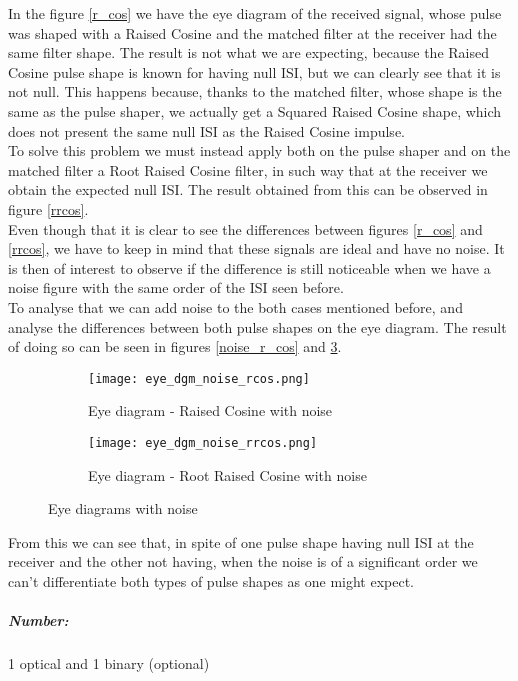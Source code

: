 In the figure \ref{r_cos} we have the eye diagram of the received signal, whose pulse was shaped with a Raised Cosine and the matched filter at the receiver had the same filter shape. The result is not what we are expecting, because the Raised Cosine pulse shape is known for having null ISI, but we can clearly see that it is not null. This happens because, thanks to the matched filter, whose shape is the same as the pulse shaper, we actually get a Squared Raised Cosine shape, which does not present the same null ISI as the Raised Cosine impulse.\\
To solve this problem we must instead apply both on the pulse shaper and on the matched filter a Root Raised Cosine filter, in such way that at the receiver we obtain the expected null ISI. The result obtained from this can be observed in figure \ref{rrcos}.\\
Even though that it is clear to see the differences between figures  \ref{r_cos} and  \ref{rrcos}, we have to keep in mind that these signals are ideal and have no noise. It is then of interest to observe if the difference is still noticeable when we have a noise figure with the same order of the ISI seen before.\\
To analyse that we can add noise to the both cases mentioned before, and analyse the differences between both pulse shapes on the eye diagram. The result of doing so can be seen in figures  \ref{noise_r_cos} and  \ref{noise_rrcos}.
\begin{figure}[H]
	\centering
        \begin{subfigure}{.55\textwidth}
        \centering
        	\texttt{[image: eye\_dgm\_noise\_rcos.png]}
            \caption{Eye diagram - Raised Cosine with noise}
            \label{noise_rcos}
        \end{subfigure}%
        \begin{subfigure}{.55\textwidth}
        \centering
        	\texttt{[image: eye\_dgm\_noise\_rrcos.png]}
        	\caption{Eye diagram - Root Raised Cosine with noise}
            \label{noise_rrcos}
        \end{subfigure}
        \caption{Eye diagrams with noise}%
\end{figure}
From this we can see that, in spite of one pulse shape having null ISI at the receiver and the other not having, when the noise is of a significant order we can't differentiate both types of pulse shapes as one might expect.

\subparagraph*{Number:} 1 optical and 1 binary (optional)


